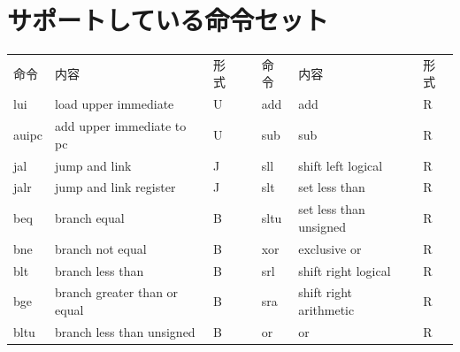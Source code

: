 \documentclass[../main.tex]{subfiles}
\begin{document}
  \section{サポートしている命令セット} \label{appendix:isa}
  \begin{table}[h]
    \begin{tabular}{|l|l|l|llll}
    \cline{1-3} \cline{5-7}
    命令    & 内容                                    & 形式 & \multicolumn{1}{l|}{} & \multicolumn{1}{l|}{命令}     & \multicolumn{1}{l|}{内容}                            & \multicolumn{1}{l|}{形式} \\ \cline{1-3} \cline{5-7}
    lui   & load upper immediate                  & U  & \multicolumn{1}{l|}{} & \multicolumn{1}{l|}{add}    & \multicolumn{1}{l|}{add}                           & \multicolumn{1}{l|}{R}  \\
    auipc & add upper immediate to pc             & U  & \multicolumn{1}{l|}{} & \multicolumn{1}{l|}{sub}    & \multicolumn{1}{l|}{sub}                           & \multicolumn{1}{l|}{R}  \\
    jal   & jump and link                         & J  & \multicolumn{1}{l|}{} & \multicolumn{1}{l|}{sll}    & \multicolumn{1}{l|}{shift left logical}            & \multicolumn{1}{l|}{R}  \\
    jalr  & jump and link register                & J  & \multicolumn{1}{l|}{} & \multicolumn{1}{l|}{slt}    & \multicolumn{1}{l|}{set less than}                 & \multicolumn{1}{l|}{R}  \\
    beq   & branch equal                          & B  & \multicolumn{1}{l|}{} & \multicolumn{1}{l|}{sltu}   & \multicolumn{1}{l|}{set less than unsigned}        & \multicolumn{1}{l|}{R}  \\
    bne   & branch not equal                      & B  & \multicolumn{1}{l|}{} & \multicolumn{1}{l|}{xor}    & \multicolumn{1}{l|}{exclusive or}                  & \multicolumn{1}{l|}{R}  \\
    blt   & branch less than                      & B  & \multicolumn{1}{l|}{} & \multicolumn{1}{l|}{srl}    & \multicolumn{1}{l|}{shift right logical}           & \multicolumn{1}{l|}{R}  \\
    bge   & branch greater than or equal          & B  & \multicolumn{1}{l|}{} & \multicolumn{1}{l|}{sra}    & \multicolumn{1}{l|}{shift right arithmetic}        & \multicolumn{1}{l|}{R}  \\
    bltu  & branch less than unsigned             & B  & \multicolumn{1}{l|}{} & \multicolumn{1}{l|}{or}     & \multicolumn{1}{l|}{or}                            & \multicolumn{1}{l|}{R}  \\

\end{tabular}
\end{table}
\end{document}
